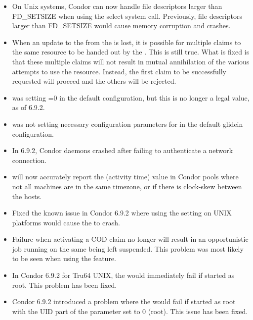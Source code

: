 \begin{itemize}

\item On Unix systems, Condor can now handle file descriptors larger than
FD\_SETSIZE when using the select system call. Previously, file descriptors
larger than FD\_SETSIZE would cause memory corruption and crashes.

\item When an update to the  from the
 is lost, it is possible for multiple claims to the
same resource to be handed out by the .  This is
still true.  What is fixed is that these multiple claims will not
result in mutual annihilation of the various attempts to use the
resource.  Instead, the first claim to be successfully requested will
proceed and the others will be rejected.

\item {} was setting =0 in the default
configuration, but this is no longer a legal value, as of 6.9.2.

\item {} was not setting necessary configuration parameters
for  in the default glidein configuration.

\item In 6.9.2, Condor daemons crashed after failing to authenticate a
network connection.

\item {} will now accurately report the 
  (activity time) value in Condor pools where not all machines are in
  the same timezone, or if there is clock-skew between the hosts.

\item Fixed the known issue in Condor 6.9.2 where using the
 setting on UNIX platforms would
cause the  to crash.

\item Failure when activating a COD claim no longer will result in an
opportunistic job running on the same  being left
suspended. This problem was most likely to be seen when using the
 feature.

\item In Condor 6.9.2 for Tru64 UNIX, the  would
immediately fail if started as root. This problem has been fixed.

\item Condor 6.9.2 introduced a problem where the 
would fail if started as root with the UID part of the
 parameter set to 0 (root). This issue has been
fixed.

\end{itemize}

